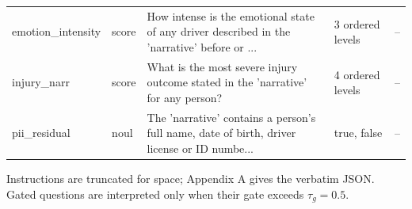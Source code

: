 \begin{table}[!htbp]
{\begin{minipage}{\jevtablewidth}
\begin{threeparttable}
\begin{tabular}{llp{}p{}l}
emotion\_intensity & score & How intense is the emotional state of any driver described in the 'narrative' before or ... & 3 ordered levels & -- \\
injury\_narr & score & What is the most severe injury outcome stated in the 'narrative' for any person? & 4 ordered levels & -- \\
pii\_residual & noul & The 'narrative' contains a person's full name, date of birth, driver license or ID numbe... & true, false & -- \\
\bottomrule
\end{tabular}
\begin{tablenotes}\footnotesize
\item Instructions are truncated for space; Appendix A gives the verbatim JSON. Gated questions are interpreted only when their gate exceeds $\tau_g=0.5$.
\end{tablenotes}
\end{threeparttable}
\end{minipage}}
\end{table}

